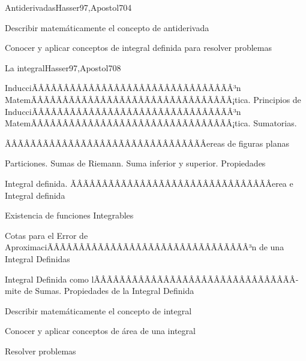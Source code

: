 \begin{sumilla}
\begin{unit}{Antiderivadas}{Hasser97,Apostol70}{4}
   \begin{objetivos}
      \item Describir matem\'aticamente el concepto de antiderivada
      \item Conocer y aplicar conceptos de integral definida para resolver problemas
   \end{objetivos}
\end{unit}

\begin{unit}{La integral}{Hasser97,Apostol70}{8}
\begin{topicos}
	\item InducciÃÂÃÂÃÂÃÂÃÂÃÂÃÂÃÂÃÂÃÂÃÂÃÂÃÂÃÂÃÂÃÂ³n MatemÃÂÃÂÃÂÃÂÃÂÃÂÃÂÃÂÃÂÃÂÃÂÃÂÃÂÃÂÃÂÃÂ¡tica. Principios de InducciÃÂÃÂÃÂÃÂÃÂÃÂÃÂÃÂÃÂÃÂÃÂÃÂÃÂÃÂÃÂÃÂ³n MatemÃÂÃÂÃÂÃÂÃÂÃÂÃÂÃÂÃÂÃÂÃÂÃÂÃÂÃÂÃÂÃÂ¡tica. Sumatorias.
	\item ÃÂÃÂÃÂÃÂÃÂÃÂÃÂÃÂÃÂÃÂÃÂÃÂÃÂÃÂÃÂÃÂereas de figuras planas
	\item Particiones. Sumas de Riemann. Suma inferior y superior. Propiedades
	\item Integral definida. ÃÂÃÂÃÂÃÂÃÂÃÂÃÂÃÂÃÂÃÂÃÂÃÂÃÂÃÂÃÂÃÂerea e Integral definida
	\item Existencia de funciones Integrables
	\item Cotas para el Error de AproximaciÃÂÃÂÃÂÃÂÃÂÃÂÃÂÃÂÃÂÃÂÃÂÃÂÃÂÃÂÃÂÃÂ³n de una Integral Definidas
	\item Integral Definida como lÃÂÃÂÃÂÃÂÃÂÃÂÃÂÃÂÃÂÃÂÃÂÃÂÃÂÃÂÃÂÃÂ­mite de Sumas. Propiedades de la Integral Definida
\end{topicos}
\begin{objetivos}
	\item Describir matem\'aticamente el concepto de integral
	\item Conocer y aplicar conceptos de \'area de una integral
	\item Resolver problemas
\end{objetivos}
\end{unit}


\end{sumilla}
